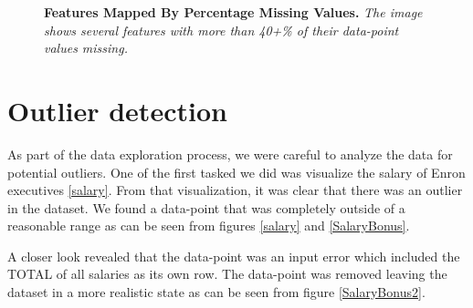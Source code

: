 \documentclass[twoside,openright,titlepage,numbers=noenddot,headinclude,%
               footinclude=true,cleardoublepage=empty,abstractoff,BCOR=5mm,%
               paper=a4,fontsize=11pt,ngerman,american]{scrreprt}
\numberwithin{theorem}{chapter}
\numberwithin{definition}{chapter}
\numberwithin{algorithm}{chapter}
\numberwithin{figure}{chapter}
\numberwithin{table}{chapter}
\numberwithin{equation}{chapter}
\begin{document}
\begin{figure}[!hbtp]
\centering
    
    \caption{\textbf{Features Mapped By Percentage Missing Values. }\textit{The image shows several features with more than 40+\% of their data-point values missing.}}
\end{figure}



\clearpage

\section*{Outlier detection}
 As part of the data exploration process, we were careful to analyze the data for potential outliers. One of the first tasked we did was visualize the salary of Enron executives \ref{salary}. From that visualization, it was clear that there was an outlier in the dataset. We found a data-point that was completely outside of a reasonable range as can be seen from figures \ref{salary} and \ref{SalaryBonus}. 

 A closer look revealed that the data-point was an input error which included the TOTAL of all salaries as its own row. The data-point was removed leaving the dataset in a more realistic state as can be seen from figure \ref{SalaryBonus2}.
\end{document}
